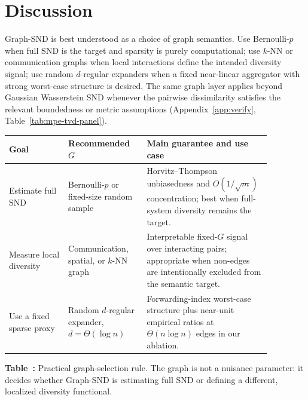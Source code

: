 \documentclass{article}
\theoremstyle{plain}
\theoremstyle{definition}
\theoremstyle{remark}
\newcommand{\SND}{\ensuremath{\mathrm{SND}}}
\begin{document}
\section{Discussion}
\label{sec:discussion}

Graph-SND is best understood as a choice of graph semantics. Use
Bernoulli-$p$ when full $\SND$ is the target and sparsity is purely
computational; use $k$-NN or communication graphs when local
interactions define the intended diversity signal; use random
$d$-regular expanders when a fixed near-linear aggregator with strong
worst-case structure is desired. The same graph layer applies beyond
Gaussian Wasserstein SND whenever the pairwise dissimilarity satisfies
the relevant boundedness or metric assumptions (Appendix~\ref{app:verify},
Table~\ref{tab:mpe-tvd-panel}).

\begin{center}
\label{tab:graph-selection-rule}
\centering
\small
\begin{tabular}{p{0.20\linewidth}p{0.25\linewidth}p{0.42\linewidth}}
\toprule
Goal & Recommended $G$ & Main guarantee and use case \\
\midrule
Estimate full $\SND$ & Bernoulli-$p$ or fixed-size random sample &
Horvitz--Thompson unbiasedness and $O(1/\sqrt m)$ concentration; best
when full-system diversity remains the target. \\
Measure local diversity & Communication, spatial, or $k$-NN graph &
Interpretable fixed-$G$ signal over interacting pairs; appropriate when
non-edges are intentionally excluded from the semantic target. \\
Use a fixed sparse proxy & Random $d$-regular expander,
$d=\Theta(\log n)$ & Forwarding-index worst-case structure plus
near-unit empirical ratios at $\Theta(n\log n)$ edges in our ablation. \\
\bottomrule
\end{tabular}
\par\smallskip
\begin{minipage}{0.96\linewidth}
\small \textbf{Table~\thetable:} Practical graph-selection rule. The graph is
not a nuisance parameter: it decides whether Graph-SND is estimating full
SND or defining a different, localized diversity functional.
\end{minipage}
\end{center}
\end{document}
